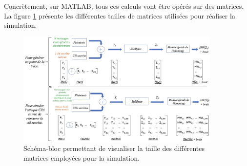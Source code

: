 \documentclass[10pt, oneside, a4paper]{article}
\begin{document}
Concrètement, sur MATLAB, tous ces calculs vont être opérés sur des matrices. La figure \ref{fig:simulCPA1} présente les différentes tailles de matrices utilisées pour réaliser la simulation.
\begin{figure}[htbp]
    \centering
    \includegraphics[width=0.9\textwidth]{image/simulCPA1}
    \caption{Schéma-bloc permettant de visualiser la taille des différentes matrices employées pour la simulation.}
    \label{fig:simulCPA1} 
\end{figure}
\end{document}
